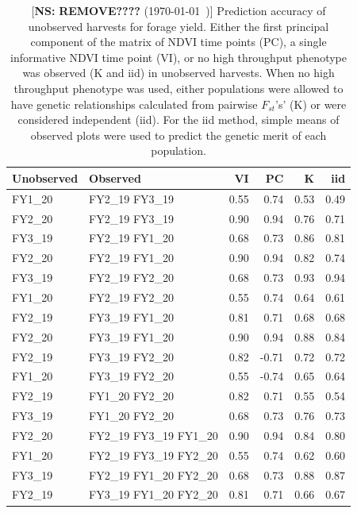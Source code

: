 \documentclass[12pt, letterpaper]{article}
\newcommand{\nicholas}[1]{{\color{nicholasCol} [\textbf{NS:} #1 (\today\ \currenttime)]}}
\begin{document}
\begin{table}[ht]
\caption{\nicholas{\textbf{REMOVE????}} Prediction accuracy of unobserved harvests for forage yield. Either the first principal component of the matrix of NDVI time points (PC), a single informative NDVI time point (VI), or no high throughput phenotype was observed (K and iid) in unobserved harvests. When no high throughput phenotype was used, either populations were allowed to have genetic relationships calculated from pairwise $F_{st}$'s' (K) or were considered independent (iid). For the iid method, simple means of observed plots were used to predict the genetic merit of each population.}
\centering
\begin{tabular*}{\hsize}{@{\extracolsep{\fill}}llrrrr}
  \hline
 Unobserved & Observed & VI & PC & K & iid \\ 
  \hline
  FY1\_20 & FY2\_19 FY3\_19 & 0.55 & 0.74 & 0.53 & 0.49 \\ 
  FY2\_20 & FY2\_19 FY3\_19 & 0.90 & 0.94 & 0.76 & 0.71 \\ 
  FY3\_19 & FY2\_19 FY1\_20 & 0.68 & 0.73 & 0.86 & 0.81 \\ 
  FY2\_20 & FY2\_19 FY1\_20 & 0.90 & 0.94 & 0.82 & 0.74 \\ 
  FY3\_19 & FY2\_19 FY2\_20 & 0.68 & 0.73 & 0.93 & 0.94 \\ 
  FY1\_20 & FY2\_19 FY2\_20 & 0.55 & 0.74 & 0.64 & 0.61 \\ 
  FY2\_19 & FY3\_19 FY1\_20 & 0.81 & 0.71 & 0.68 & 0.68 \\ 
  FY2\_20 & FY3\_19 FY1\_20 & 0.90 & 0.94 & 0.88 & 0.84 \\ 
  FY2\_19 & FY3\_19 FY2\_20 & 0.82 & -0.71 & 0.72 & 0.72 \\ 
  FY1\_20 & FY3\_19 FY2\_20 & 0.55 & -0.74 & 0.65 & 0.64 \\ 
  FY2\_19 & FY1\_20 FY2\_20 & 0.82 & 0.71 & 0.55 & 0.54 \\ 
  FY3\_19 & FY1\_20 FY2\_20 & 0.68 & 0.73 & 0.76 & 0.73 \\ 
  FY2\_20 & FY2\_19 FY3\_19 FY1\_20 & 0.90 & 0.94 & 0.84 & 0.80 \\ 
  FY1\_20 & FY2\_19 FY3\_19 FY2\_20 & 0.55 & 0.74 & 0.62 & 0.60 \\ 
  FY3\_19 & FY2\_19 FY1\_20 FY2\_20 & 0.68 & 0.73 & 0.88 & 0.87 \\ 
  FY2\_19 & FY3\_19 FY1\_20 FY2\_20 & 0.81 & 0.71 & 0.66 & 0.67 \\ 
   \hline
\end{tabular*}
\end{table}
\end{document}
